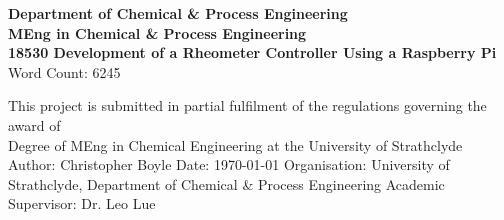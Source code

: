 \documentclass[twoside,a4]{report}
\def\atitle{Development of a Rheometer Controller Using a Raspberry Pi}
\def\thewords{6245} %
\begin{document}
	\begin{titlepage}
		\centering
		\vskip3cm
		{
			\bfseries\Large
			Department of Chemical \& Process Engineering\\
			\vskip1cm
			MEng in Chemical \& Process Engineering\\
			18530
			\vskip3cm
			\LARGE\atitle
		}
		\vskip3cm
		{\small Word Count: \thewords}
		\vskip1cm
		\begin{flushleft}
			This project is submitted in partial fulfilment of the regulations governing the award of \\
			Degree of MEng in Chemical Engineering at the University of Strathclyde
			\vskip2cm
			Author: Christopher Boyle \hfill Date: \today \newline
			\vskip1cm
			Organisation: University of Strathclyde, Department of Chemical \& Process Engineering \newline
			Academic Supervisor: Dr. Leo Lue
		\end{flushleft}
	\end{titlepage}

	\setcounter{page}{0}
	\begin{center}\newpage \end{center}
	
\end{document}
